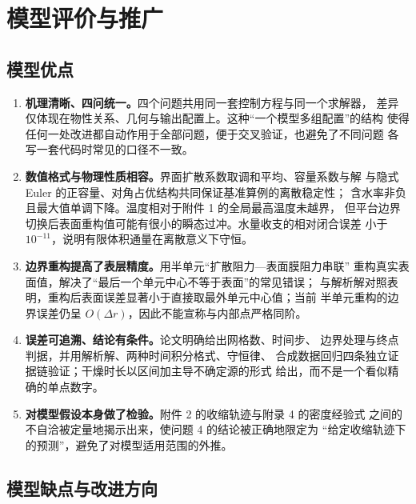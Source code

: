 \section{模型评价与推广}

\subsection{模型优点}

\begin{enumerate}[leftmargin=2.2em,itemsep=0.3em]
  \item \textbf{机理清晰、四问统一。}四个问题共用同一套控制方程与同一个求解器，
        差异仅体现在物性关系、几何与输出配置上。这种“一个模型多组配置”的结构
        使得任何一处改进都自动作用于全部问题，便于交叉验证，也避免了不同问题
        各写一套代码时常见的口径不一致。
  \item \textbf{数值格式与物理性质相容。}界面扩散系数取调和平均、容量系数与解
        与隐式 Euler 的正容量、对角占优结构共同保证基准算例的离散稳定性；
        含水率非负且最大值单调下降。温度相对于附件 1 的全局最高温度未越界，
        但平台边界切换后表面重构值可能有很小的瞬态过冲。水量收支的相对闭合误差
        小于 $10^{-11}$，说明有限体积通量在离散意义下守恒。
  \item \textbf{边界重构提高了表层精度。}用半单元“扩散阻力—表面膜阻力串联”
        重构真实表面值，解决了“最后一个单元中心不等于表面”的常见错误；
        与解析解对照表明，重构后表面误差显著小于直接取最外单元中心值；当前
        半单元重构的边界误差仍呈 $O(\Delta r)$，因此不能宣称与内部点严格同阶。
  \item \textbf{误差可追溯、结论有条件。}论文明确给出网格数、时间步、
        边界处理与终点判据，并用解析解、两种时间积分格式、守恒律、
        合成数据回归四条独立证据链验证；干燥时长以区间加主导不确定源的形式
        给出，而不是一个看似精确的单点数字。
  \item \textbf{对模型假设本身做了检验。}附件 2 的收缩轨迹与附录 4 的密度经验式
        之间的不自洽被定量地揭示出来，使问题 4 的结论被正确地限定为
        “给定收缩轨迹下的预测”，避免了对模型适用范围的外推。
\end{enumerate}

\subsection{模型缺点与改进方向}

